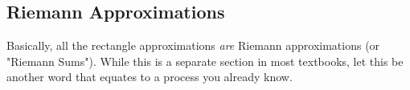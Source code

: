 
\subsection*{Riemann Approximations}
Basically, all the rectangle approximations \textit{are} Riemann approximations (or "Riemann Sums"). While this is a separate section in most textbooks, let this be another word that equates to a process you already know.



\newpage
